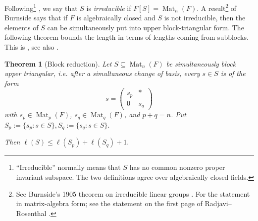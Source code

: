 \documentclass[11pt]{article}
\newtheorem{theorem}{Theorem}[section]
\renewcommand{\geq}{\geqslant}
\renewcommand{\leq}{\leqslant}
\newcommand{\smat}[1]{\left( \begin{smallmatrix} #1 \end{smallmatrix} \right)}
\newcommand{\calL}{\mathcal{L}}
\newcommand{\Mat}{\operatorname{Mat}}
\newtheorem{auxiliary proposition}[theorem]{Auxiliary Proposition}
\newtheorem{main conjecture}[theorem]{Main Conjecture}
\newtheorem{main theorem}[theorem]{Main Theorem}
\newtheorem{modesty proposition}[theorem]{Modesty Proposition}
\newtheorem{open problem}[theorem]{Open Problem}
\newtheorem{convergence lemma}[theorem]{Convergence Lemma}
\newtheorem{corrected lemma}[theorem]{Corrected Lemma}
\newtheorem{growth lemma}[theorem]{Growth Lemma}
\newtheorem{coefficient lemma}[theorem]{Integrality Lemma}
\newtheorem{interpolation lemma}[theorem]{Interpolation Lemma}
\newtheorem{kernel lemma}[theorem]{Kernel Lemma}
\newtheorem{limit lemma}[theorem]{Limit Lemma}
\newtheorem{tandem lemma}[theorem]{Modesty Lemma}
\newtheorem{zero-finding lemma}[theorem]{Zero-Finding Lemma}
\numberwithin{equation}{section}
\begin{document}
Following\footnote{``Irreducible'' normally means that $S$ has no common
	nonzero proper invariant subspace.  The two definitions agree over algebraically closed fields.} \cite[1. Warm-Up]{Shitov2019}, we say that $S$ is \textit{irreducible} if $F[S]=\Mat_n(F)$. %
A result\footnote{See Burnside's 1905 theorem on irreducible linear groups \cite{Burnside1905}. For the statement in matrix-algebra form; see the statement on the first page of Radjavi--Rosenthal \cite[Theorem 1.5.1]{RadjaviRosenthal2000}.} of Burnside says that if $F$ is algebraically closed and $S$ is not irreducible, then the elements of $S$ can be simultaneously put into upper block-triangular form.
The following theorem bounds the length in terms of lengths coming from subblocks. This is \cite[Corollary~3]{Markova2005}, see also \cite[Lemma~4]{Shitov2019}. 

\begin{theorem}[Block reduction]
\label{thm:block-reduction}
Let $S\subseteq \Mat_n(F)$ be simultaneously block upper triangular, i.e. after a simultaneous change of basis, every $s\in S$ is of the form
$$ s=\smat{ s_p & * \\ 0 & s_q}$$
with $s_p\in \Mat_p(F)$, $s_q\in \Mat_q(F)$, and $p+q=n$. Put
$S_p:=\{s_p:s\in S\}, S_q:=\{s_q:s\in S\}.$

Then $\ell(S)\leq \ell(S_p)+\ell(S_q)+1.$
\end{theorem}


\end{document}
